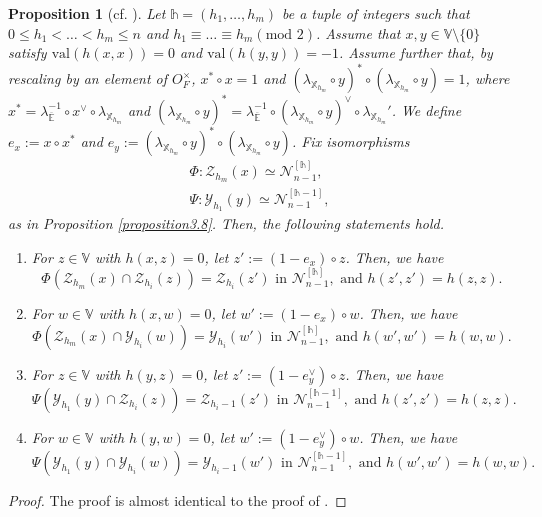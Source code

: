 \documentclass[11pt,oneside]{amsart}
\newcommand{\val}{{\mathrm{val}}}
\theoremstyle{plain}
\newtheorem{proposition}[theorem]{Proposition}
\theoremstyle{definition}
\theoremstyle{remark}
\newcommand{\tx}[1]{\text{#1}}
\newcommand{\BE}{{\mathbb E}}
\newcommand{\BV}{{\mathbb V}}
\newcommand{\BX}{{\mathbb X}}
\newcommand{\CN}{{\mathcal N}}
\newcommand{\CY}{{\mathcal Y}}
\newcommand{\CZ}{{\mathcal Z}}
\numberwithin{equation}{section}
\begin{document}
	
	\begin{proposition}[cf. {\cite[Proposition 5.11]{cho2018basic}}] \label{proposition3.9}
		Let $\mathds{h}=(h_1,\dots,h_m)$ be a tuple of integers such that $0\leq h_1<\dots<h_m \leq n$ and $h_1 \equiv \dots \equiv h_m (\tx{mod } 2)$. Assume that $x,y \in \BV \setminus \lbrace 0 \rbrace$ satisfy $\val(h(x,x))=0$ and $\val(h(y,y))=-1$. Assume further that, by rescaling by an element of $O_F^{\times}$, $x^{*}\circ x=1$ and $(\lambda_{\BX_{h_m}}\circ y)^* \circ (\lambda_{\BX_{h_m}}\circ y)=1$, where $x^*=\lambda_{\overline{\BE}}^{-1} \circ x^{\vee} \circ \lambda_{\BX_{h_m}}$ and $(\lambda_{\BX_{h_m}}\circ y)^*=\lambda_{\overline{\BE}}^{-1} \circ (\lambda_{\BX_{h_m}}\circ y)^{\vee} \circ \lambda_{\BX_{h_m}}'$. We define $e_x:=x \circ x^{*}$ and $e_y:=(\lambda_{\BX_{h_m}}\circ y)^{*}\circ (\lambda_{\BX_{h_m}}\circ y)$. Fix isomorphisms
		\begin{equation*}
			\begin{array}{l}
				\Phi:\CZ_{h_m}(x) \simeq \CN_{n-1}^{[\mathds{h}]},\\
				\Psi: \CY_{h_1}(y) \simeq \CN_{n-1}^{[\mathds{h}-1]},
			\end{array}
		\end{equation*}
		as in Proposition \ref{proposition3.8}. Then, the following statements hold.
		\begin{enumerate}
			\item For $z \in \BV$ with $h(x,z)=0$, let $z':=(1-e_x)\circ z$. Then, we have
			\begin{equation*}
				\Phi(\CZ_{h_m}(x) \cap \CZ_{h_i}(z))=\CZ_{h_i}(z') \tx{ in } \CN_{n-1}^{[\mathds{h}]},\tx{ and }h(z',z')=h(z,z).
			\end{equation*}
			\item For $w \in \BV$ with $h(x,w)=0$, let $w':=(1-e_x)\circ w$. Then, we have
			\begin{equation*}
				\Phi(\CZ_{h_m}(x) \cap \CY_{h_i}(w))=\CY_{h_i}(w') \tx{ in } \CN_{n-1}^{[\mathds{h}]},\tx{ and }h(w',w')=h(w,w).
			\end{equation*}
			\item For $z \in \BV$ with $h(y,z)=0$, let $z':=(1-e_y^{\vee})\circ z$. Then, we have
			\begin{equation*}
				\Psi(\CY_{h_1}(y) \cap \CZ_{h_i}(z))=\CZ_{h_i-1}(z') \tx{ in } \CN_{n-1}^{[\mathds{h}-1]},\tx{ and }h(z',z')=h(z,z).
			\end{equation*}
			\item For $w \in \BV$ with $h(y,w)=0$, let $w':=(1-e_y^{\vee})\circ w$. Then, we have
			\begin{equation*}
				\Psi(\CY_{h_1}(y) \cap \CY_{h_i}(w))=\CY_{h_i-1}(w') \tx{ in } \CN_{n-1}^{[\mathds{h}-1]},\tx{ and }h(w',w')=h(w,w).
			\end{equation*}
		\end{enumerate}
	\end{proposition}
	\begin{proof}
		The proof is almost identical to the proof of \cite[Proposition 5.12]{cho2018basic}.
	\end{proof}
	
\end{document}
